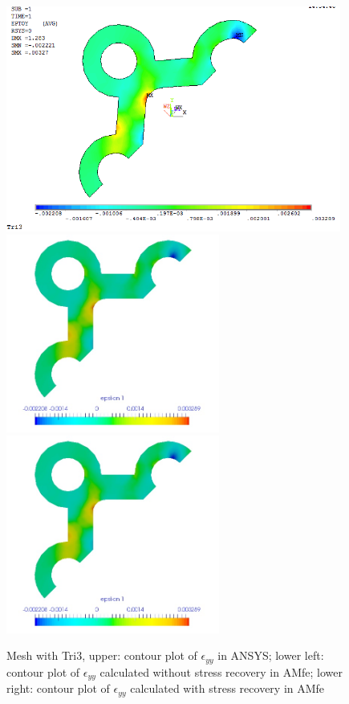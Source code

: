 \begin{figure}[htbp]
	\begin{center}
		\includegraphics[width=11cm,clip]{TTri3_Eyy.png} 	
		\includegraphics[width=7cm,clip]{TTri3_Eyy_PD.png} 	
		\includegraphics[width=7cm,clip]{TTri3_Eyy_P.png} 		
		\caption{Mesh with Tri3, upper: contour plot of $\epsilon_{yy}$ in ANSYS; lower left: contour plot of $\epsilon_{yy}$ calculated without stress recovery in AMfe; lower right: contour plot of $\epsilon_{yy}$ calculated with stress recovery in AMfe} \label{fig: Tri3_Eyy}
	\end{center}
\end{figure}
\clearpage 

